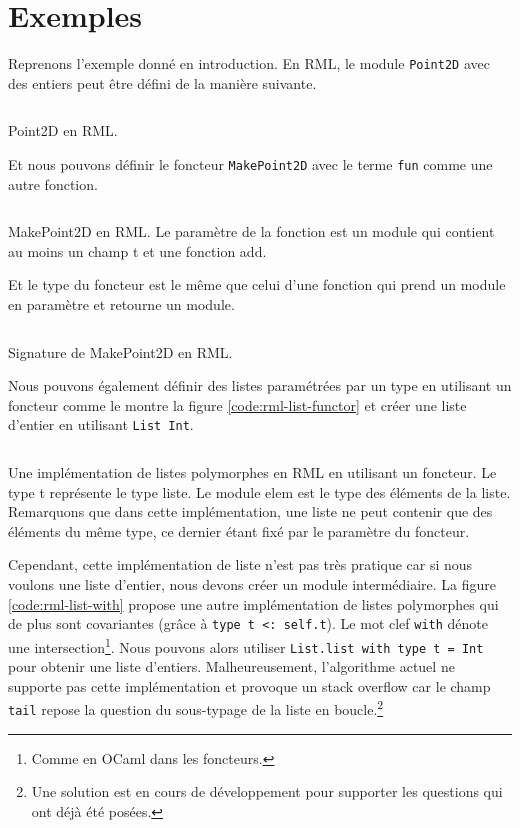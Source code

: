 \section{Exemples}

Reprenons l'exemple donné en introduction. En RML, le module \verb|Point2D| avec
des entiers peut être défini de la manière suivante.

\begin{listing}
  \inputminted{OCaml}{codes/point2d.rml}
  \caption{Point2D en RML.}
\end{listing}

Et nous pouvons définir le foncteur \verb|MakePoint2D| avec le terme \verb|fun|
comme une autre fonction.

\begin{listing}
  \inputminted{OCaml}{codes/makepoint2d.rml}
  \caption{MakePoint2D en RML. Le paramètre de la fonction est un module qui
    contient au moins un champ t et une fonction add.}
  \label{code:rml-point2d}
\end{listing}

Et le type du foncteur est le même que celui d'une fonction qui prend un module
en paramètre et retourne un module.

\begin{listing}
  \inputminted{OCaml}{codes/makepoint2d_sig.rml}
  \caption{Signature de MakePoint2D en RML.}
  \label{code:rml-makepoint2d}
\end{listing}

Nous pouvons également définir des listes paramétrées par un type en utilisant un foncteur
comme le montre la figure \ref{code:rml-list-functor} et créer une liste d'entier en
utilisant \verb|List Int|.

\begin{listing}
  \inputminted{OCaml}{codes/list_functor.rml}
  \caption{Une implémentation de listes polymorphes en RML en utilisant un
    foncteur. Le type t représente le type liste. Le module elem
    est le type des éléments de la liste. Remarquons que dans cette
    implémentation, une liste ne peut contenir que des éléments du même type, ce
    dernier étant fixé par le paramètre du foncteur.}
  \label{code:rml-list-functor}
\end{listing}

Cependant, cette implémentation de liste n'est pas très pratique car si nous
voulons une liste d'entier, nous devons créer un module intermédiaire. La figure
\ref{code:rml-list-with} propose une autre implémentation de listes polymorphes
qui de plus sont covariantes (grâce à \verb|type t <: self.t|). Le mot clef
\verb|with| dénote une intersection\footnote{Comme en OCaml dans
  les foncteurs.}. Nous pouvons alors utiliser \verb|List.list with type t = Int|
pour obtenir une liste d'entiers. Malheureusement, l'algorithme actuel ne
supporte pas cette implémentation et provoque un stack overflow car le champ
\verb|tail| repose la question du sous-typage de la liste en
boucle.\footnote{Une solution est en cours de développement pour supporter les
  questions qui ont déjà été posées.}

